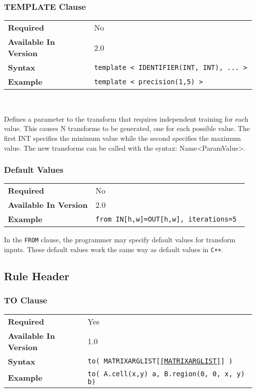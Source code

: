 \documentclass[11pt]{article}
\begin{document}
\subsubsection{TEMPLATE Clause}

\begin{tabular}{| l | l |}
\hline
\bf Required & No \\
\bf Available In Version & 2.0            \\
\bf Syntax & \tt template < IDENTIFIER(INT, INT), ... > \\
\bf Example & \tt template < precision(1,5) > \\
\hline
\end{tabular}

~

\noindent Defines a parameter to the transform that requires independent
training for each value.  This causes N transforms to be generated, one for
each possible value.  The first INT specifies the minimum value while the
second specifies the maximum value.  The new transforms can be called with
the syntax: Name<ParamValue>.

\subsubsection{Default Values}

\begin{tabular}{| l | l |}
\hline
\bf Required & No \\
\bf Available In Version & 2.0            \\
\bf Example & \tt from IN[h,w]=OUT[h,w], iterations=5 \\
\hline
\end{tabular}

In the {\tt FROM} clause, the programmer may specify default values for transform inputs.
These default values work the same way as default values in {\tt C++}.  

\subsection{Rule Header}
\label{sec:rule}

\subsubsection{TO Clause}
\label{TO}
\begin{tabular}{| l | l |}
\hline
\bf Required & Yes                          \\
\bf Available In Version & 1.0             \\
\bf Syntax & \tt to( MATRIXARGLIST[\ref{MATRIXARGLIST}] ) \\
\bf Example & \tt to( A.cell(x,y) a, B.region(0, 0, x, y) b)\\
\hline
\end{tabular}
\end{document}
